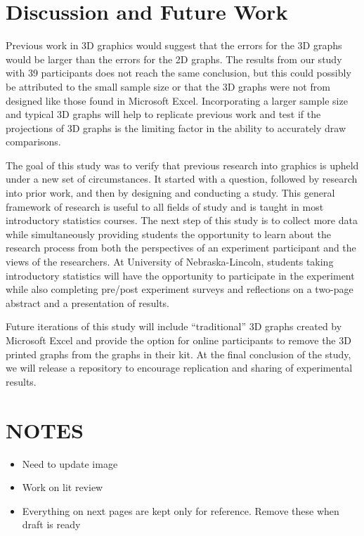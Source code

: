 \documentclass[letterpaper,inpress]{jdsart}
\begin{document}
\hypertarget{discussion-and-future-work}{%
\section{Discussion and Future Work}\label{discussion-and-future-work}}

Previous work in 3D graphics would suggest that the errors for the 3D graphs would be larger than the errors for the 2D graphs. The results from our study with 39 participants does not reach the same conclusion, but this could possibly be attributed to the small sample size or that the 3D graphs were not from designed like those found in Microsoft Excel. Incorporating a larger sample size and typical 3D graphs will help to replicate previous work and test if the projections of 3D graphs is the limiting factor in the ability to accurately draw comparisons.

The goal of this study was to verify that previous research into graphics is upheld under a new set of circumstances. It started with a question, followed by research into prior work, and then by designing and conducting a study. This general framework of research is useful to all fields of study and is taught in most introductory statistics courses. The next step of this study is to collect more data while simultaneously providing students the opportunity to learn about the research process from both the perspectives of an experiment participant and the views of the researchers. At University of Nebraska-Lincoln, students taking introductory statistics will have the opportunity to participate in the experiment while also completing pre/post experiment surveys and reflections on a two-page abstract and a presentation of results.

Future iterations of this study will include ``traditional'' 3D graphs created by Microsoft Excel and provide the option for online participants to remove the 3D printed graphs from the graphs in their kit. At the final conclusion of the study, we will release a repository to encourage replication and sharing of experimental results.

\newpage

\hypertarget{notes}{%
\section{NOTES}\label{notes}}

\begin{itemize}
\item
  Need to update image
\item
  Work on lit review
\item
  Everything on next pages are kept only for reference. Remove these when draft is ready
\end{itemize}
\end{document}

